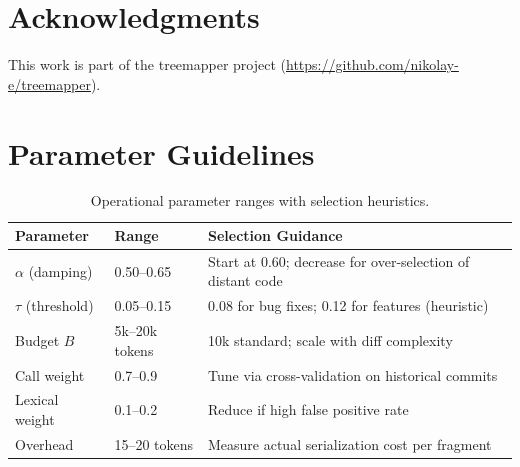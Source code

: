 \documentclass[11pt, a4paper]{article}
\begin{document}
\newpage
\section*{Acknowledgments}

This work is part of the treemapper project (\url{https://github.com/nikolay-e/treemapper}).

\appendix

\newpage
\section{Parameter Guidelines}

\begin{table}[h]
\centering
\begin{tabular}{llp{6cm}}
\toprule
\textbf{Parameter} & \textbf{Range} & \textbf{Selection Guidance} \\
\midrule
$\alpha$ (damping) & 0.50--0.65 & Start at 0.60; decrease for over-selection of distant code \\
$\tau$ (threshold) & 0.05--0.15 & 0.08 for bug fixes; 0.12 for features (heuristic) \\
Budget $B$ & 5k--20k tokens & 10k standard; scale with diff complexity \\
Call weight & 0.7--0.9 & Tune via cross-validation on historical commits \\
Lexical weight & 0.1--0.2 & Reduce if high false positive rate \\
Overhead & 15--20 tokens & Measure actual serialization cost per fragment \\
\bottomrule
\end{tabular}
\caption{Operational parameter ranges with selection heuristics.}
\end{table}
\end{document}
